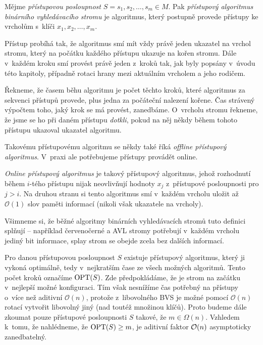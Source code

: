 \begin{definice}
Mějme \emph{přístupovou posloupnost} $S=s_1, s_2,\dots,s_m \in M$. Pak \emph{přístupový algoritmus
binárního vyhledávacího stromu} je algoritmus, který postupně provede přístupy
ke vrcholům s~klíči $x_1, x_2,\dots,x_m$.

Přístup probíhá tak, že algoritmus smí mít vždy právě jeden ukazatel na vrchol
stromu, který na počátku každého přístupu ukazuje na kořen stromu. Dále
v~každém kroku smí provést právě jeden z~kroků tak, jak byly popsány v~úvodu této kapitoly, případně rotaci hrany mezi aktuálním vrcholem a jeho rodičem. 

Řekneme, že časem běhu algoritmu je počet těchto kroků, které algoritmus za sekvenci
přístupů provede, plus jedna za počáteční nalezení kořene. Čas strávený výpočtem toho, jaký krok se má provést, zanedbáme. O~vrcholu stromu řekneme, že jsme se ho při daném
přístupu \emph{dotkli}, pokud na něj někdy během tohoto přístupu ukazoval
ukazatel algoritmu.  \end{definice}

Takovému přístupovému algoritmu se někdy také říká \emph{offline přístupový
algoritmus}. V~praxi ale potřebujeme přístupy provádět online.

\begin{definice}
\emph{Online přístupový algoritmus} je takový přístupový algoritmus, jehož
rozhodnutí během $i$-tého přístupu nijak neovlivňují hodnoty $x_j$ z~přístupové
posloupnosti pro $j>i$. Na druhou stranu si tento algoritmus smí v~každém
vrcholu uložit až $\mathcal O(1)$ slov paměti informací (nikoli však ukazatele
na vrcholy).
\end{definice}

Všimneme si, že běžné algoritmy binárních vyhledávacích stromů tuto definici
splňují -- například červenočerné a AVL stromy potřebují v~každém vrcholu
jediný bit informace, splay strom se obejde zcela bez dalších informací.

Pro danou přístupovou posloupnost $S$ existuje přístupový algoritmus, který ji
vykoná optimálně, tedy v~nejkratším čase ze všech možných algoritmů. Tento
počet kroků označíme $\operatorname{OPT}(S)$. Zde předpokládáme, že je strom na začátku
v~nejlepší možné konfiguraci. Tím však nesnížíme čas potřebný na přístupy o~více
než aditivní $\mathcal O(n)$, protože z~libovolného BVS je možné pomocí
$\mathcal O(n)$ rotací vytvořit libovolný jiný (nad toutéž množinou klíčů).
Proto budeme dále zkoumat pouze přístupové posloupnosti $S$ takové, že $m \in
\Omega(n)$. Vzhledem k~tomu, že nahlédneme, že $\operatorname{OPT}(S)\geq m$, je aditivní
faktor $\mathcal O(n)$ asymptoticky zanedbatelný. 


